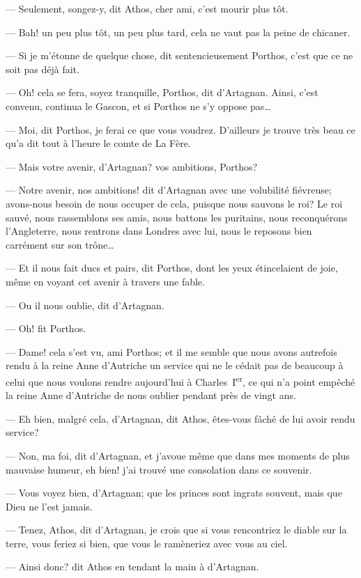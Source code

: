 — Seulement, songez-y, dit Athos, cher ami, c'est mourir plus tôt.

— Bah! un peu plus tôt, un peu plus tard, cela ne vaut pas la peine de chicaner.

— Si je m'étonne de quelque chose, dit sentencieusement Porthos, c'est que ce ne soit pas déjà fait.

— Oh! cela se fera, soyez tranquille, Porthos, dit d'Artagnan. Ainsi, c'est convenu, continua le Gascon, et si Porthos ne s'y oppose pas\dots

— Moi, dit Porthos, je ferai ce que vous voudrez. D'ailleurs je trouve très beau ce qu'a dit tout à l'heure le comte de La Fère.

— Mais votre avenir, d'Artagnan? vos ambitions, Porthos?

— Notre avenir, nos ambitions! dit d'Artagnan avec une volubilité fiévreuse; avons-nous besoin de nous occuper de cela, puisque nous sauvons le roi? Le roi sauvé, nous rassemblons ses amis, nous battons les puritains, nous reconquérons l'Angleterre, nous rentrons dans Londres avec lui, nous le reposons bien carrément sur son trône\dots

— Et il nous fait ducs et pairs, dit Porthos, dont les yeux étincelaient de joie, même en voyant cet avenir à travers une fable.

— Ou il nous oublie, dit d'Artagnan.

— Oh! fit Porthos.

— Dame! cela s'est vu, ami Porthos; et il me semble que nous avons autrefois rendu à la reine Anne d'Autriche un service qui ne le cédait pas de beaucoup à celui que nous voulons rendre aujourd'hui à Charles~I\textsuperscript{er}, ce qui n'a point empêché la reine Anne d'Autriche de nous oublier pendant près de vingt ans.

— Eh bien, malgré cela, d'Artagnan, dit Athos, êtes-vous fâché de lui avoir rendu service?

— Non, ma foi, dit d'Artagnan, et j'avoue même que dans mes moments de plus mauvaise humeur, eh bien! j'ai trouvé une consolation dans ce souvenir.

— Vous voyez bien, d'Artagnan; que les princes sont ingrats souvent, mais que Dieu ne l'est jamais.

— Tenez, Athos, dit d'Artagnan, je crois que si vous rencontriez le diable sur la terre, vous feriez si bien, que vous le ramèneriez avec vous au ciel.

— Ainsi donc? dit Athos en tendant la main à d'Artagnan.

